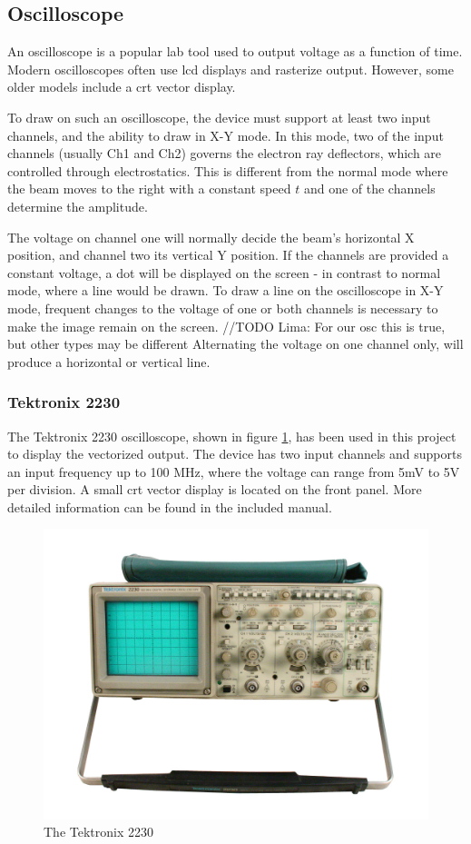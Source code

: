 \subsection{Oscilloscope}
An oscilloscope is a popular lab tool used to output voltage as a function of time.
Modern oscilloscopes often use \gls{lcd} displays and rasterize output. 
However, some older models include a \gls{crt} vector display.

To draw on such an oscilloscope, the device must support at least two input channels, and the ability to draw in X-Y mode.
In this mode, two of the input channels (usually Ch1 and Ch2) governs the electron ray deflectors, which are controlled through electrostatics. 
This is different from the normal mode where the beam moves to the right with a constant speed \( t \) and one of the channels determine the amplitude.

The voltage on channel one will normally decide the beam's horizontal X position, and channel two its vertical Y position.
If the channels are provided a constant voltage, a dot will be displayed on the screen - in contrast to normal mode, where a line would be drawn.
To draw a line on the oscilloscope in X-Y mode, frequent changes to the voltage of one or both channels is necessary to make the image remain on the screen. //TODO Lima: For our osc this is true, but other types may be different
Alternating the voltage on one channel only, will produce a horizontal or vertical line.

\subsubsection{Tektronix 2230}
The Tektronix 2230 oscilloscope, shown in figure \ref{fig:oscilloscope}, has been used in this project to display the vectorized output.
The device has two input channels and supports an input frequency up to 100 MHz, where the voltage can range from 5mV to 5V per division.
A small \gls{crt} vector display is located on the front panel.
More detailed information can be found in the included manual\cite{tektronix2230}.

\begin{figure}[h!]
	\centering
	\includegraphics[width=0.6\linewidth]{images/oscilloscope.jpg}
    \caption{The Tektronix 2230\cite{oscilloscope}}
    \label{fig:oscilloscope}
\end{figure}


